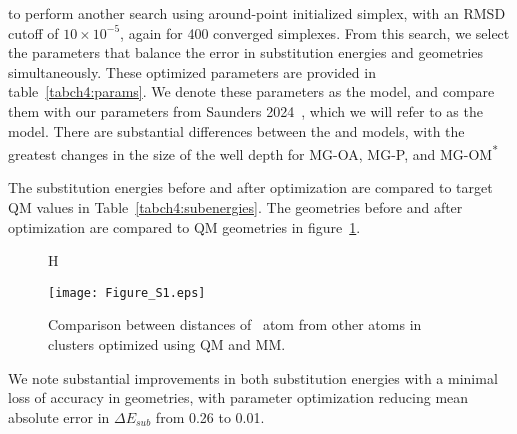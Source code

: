 to perform another search using around-point initialized simplex, with an RMSD cutoff of $10\times{}10^{-5}$, again for 400 converged simplexes. From this search, we select the parameters that balance
the error in substitution energies and geometries simultaneously. 
These optimized parameters are provided in table~\ref{tabch4:params}. We denote these parameters as the  model, and compare them with our parameters from 
Saunders \etal{} 2024~\cite{saunders:2024}, which we will refer to as the  model.
There are substantial differences between the  and  models, with the greatest changes in the size of the well depth \epsilonij{} for MG-OA, MG-P, and MG-OM\textsuperscript{*}

The substitution energies before and after optimization are compared to target QM values in Table~\ref{tabch4:subenergies}. The geometries before and after optimization are compared to QM geometries in figure~\ref{figch4:optres}. 
\begin{landscape}
    \begin{figure}{H}
    \centering
    \caption[Geometry of optimized clusters of small molecules]{Comparison between distances of \mg~atom from other atoms in clusters optimized using QM and MM.}
    \label{figch4:optres}
    \texttt{[image: Figure\_S1.eps]}
\end{figure}
\end{landscape}
We note substantial improvements in both substitution energies with a minimal loss of accuracy in geometries, 
with parameter optimization reducing mean absolute error in $\Delta E_{sub}$ from 0.26 to 0.01. %
